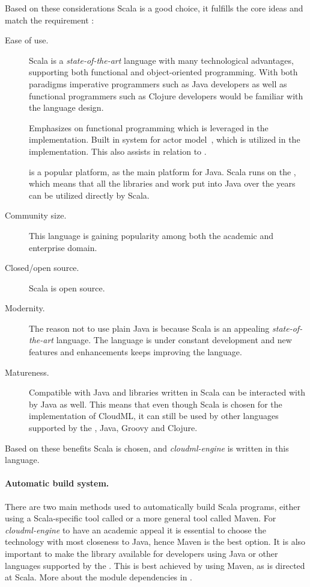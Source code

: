 Based on these considerations Scala is a good choice, it fulfills the core ideas and match
the requirement :
\begin{description} 
  \item[Ease of use.]
    Scala is a \emph{state-of-the-art} language with many technological advantages,
    \eg supporting both functional and object-oriented programming.
    With both paradigms imperative programmers such as Java developers as well as functional
    programmers such as Clojure developers would be familiar with the language design.
    
    Emphasizes on functional programming which is leveraged in the implementation.
    Built in system for actor model~\cite{actors:haller07}, which is utilized in the implementation.
    This also assists in relation to .

     is a popular platform, as the main platform for Java.
    Scala runs on the , which means that all the libraries and work put into Java
    over the years can be utilized directly by Scala.
  \item[Community size.]
    This language is gaining popularity among both the academic and enterprise domain.
  \item[Closed/open source.] Scala is open source.
  \item[Modernity.]
    The reason not to use plain Java is because Scala is an appealing \emph{state-of-the-art} language.
    The language is under constant development and new features and enhancements keeps improving
    the language.
  \item[Matureness.]
    Compatible with Java and libraries written in Scala can be interacted with by Java as well.
    This means that even though Scala is chosen for the implementation of CloudML,
    it can still be used by other languages supported by the ,
    \eg Java, Groovy and Clojure.
\end{description}
Based on these benefits Scala is chosen, and \emph{cloudml-engine} is written in this language.

\paragraph{Automatic build system.}

There are two main methods used to automatically build Scala programs, 
either using a Scala-specific tool called  or a more general tool called Maven. 
For \emph{cloudml-engine} to have an academic appeal it is essential to choose the technology
with most closeness to Java, hence Maven is the best option.
It is also important to make the library available for developers using Java or other
languages supported by the .
This is best achieved by using Maven, as  is directed at Scala.
More about the module dependencies in .

